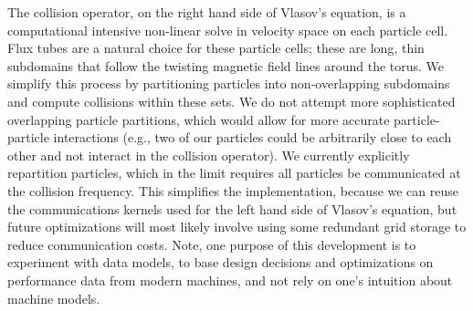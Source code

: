 \documentclass[review]{siamart}
\begin{document}
The collision operator, on the right hand side of Vlasov's equation, is a computational intensive non-linear solve in velocity space on each particle cell.
Flux tubes are a natural choice for these particle cells; these are long, thin subdomains that follow the twisting magnetic field lines around the torus.
We simplify this process by partitioning particles into non-overlapping subdomains and compute collisions within these sets.
We do not attempt more sophisticated overlapping particle partitions, which would allow for more accurate particle-particle interactions (e.g., two of our particles could be arbitrarily close to each other and not interact in the collision operator).
We currently explicitly repartition particles, which in the limit requires all particles be communicated at the collision frequency.
This simplifies the implementation, because we can reuse the communications kernels used for the left hand side of Vlasov's equation, but future optimizations will most likely involve using some redundant grid storage to reduce communication costs.
Note, one purpose of this development is to experiment with data models, to base design decisions and optimizations on performance data from modern machines, and not rely on one's intuition about machine models.
\end{document}
